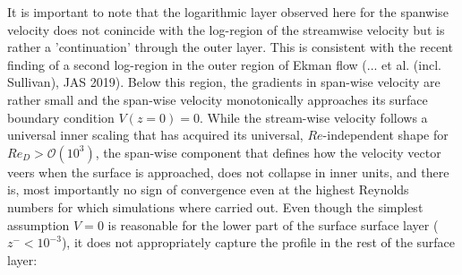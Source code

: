 \documentclass[a4paper,11pt]{amsart}
\begin{document}
%
%
 It is important to note that the logarithmic layer observed here for the spanwise velocity does not
conincide with the log-region of the streamwise velocity but is rather a 'continuation' through the outer layer.
%
This is consistent with the recent finding of a second log-region in the outer region of Ekman flow
(... et al. (incl. Sullivan), JAS 2019).
%
Below this region, the gradients in span-wise velocity are rather small and the span-wise velocity
monotonically approaches its surface boundary condition $V(z=0)=0$.
%
While the stream-wise velocity follows a universal inner scaling that has acquired its universal, $Re$-independent shape for $Re_D> \mathcal{O}\left(10^3\right)$, the span-wise component that defines how the velocity vector veers when the surface is approached,
does not collapse in inner units, and there is, most importantly no sign of convergence even at the highest Reynolds numbers for
which simulations where carried out.
%
Even though the simplest assumption $V=0$ is reasonable for the lower part of the surface surface layer ($z^-<10^{-3}$), it does
not appropriately capture the profile in the rest of the surface layer:
\end{document}
